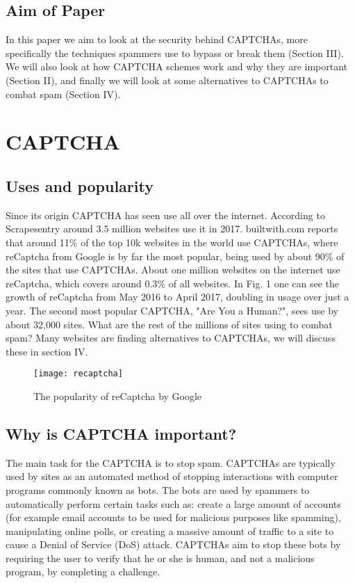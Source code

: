 \documentclass[a4paper]{IEEEtran}
\begin{document}
\subsection{Aim of Paper}
In this paper we aim to look at the security behind CAPTCHAs, more specifically the techniques spammers use to bypass or break them (Section III). We will also look at how CAPTCHA schemes work and why they are important (Section II), and finally we will look at some alternatives to CAPTCHAs to combat spam (Section IV). 

\section{CAPTCHA}

\subsection{Uses and popularity}
Since its origin CAPTCHA has seen use all over the internet. According to Scrapesentry around 3.5 million websites use it in 2017\cite{scrapesentry}. builtwith.com reports that around 11\% of the top 10k websites in the world use CAPTCHAs, where reCaptcha from Google is by far the most popular, being used by about 90\% of the sites that use CAPTCHAs\cite{stats}. About one million websites on the internet use reCaptcha, which covers around 0.3\% of all websites. In Fig. 1 one can see the growth of reCaptcha from May 2016 to April 2017, doubling in usage over just a year. The second most popular CAPTCHA, "Are You a Human?", sees use by about 32,000 sites. What are the rest of the millions of sites using to combat spam? Many websites are finding alternatives to CAPTCHAs, we will discuss these in section IV.

\begin{figure}
\centering
\texttt{[image: recaptcha]}
\caption[The popularity of reCaptcha]{The popularity of reCaptcha by Google\cite{recaptchastats}}
\label{Popularity of reCaptcha}
\end{figure} 

\subsection{Why is CAPTCHA important?}
The main task for the CAPTCHA is to stop spam. CAPTCHAs are typically used by sites as an automated method of stopping interactions with computer programs commonly known as bots. The bots are used by spammers to automatically perform certain tasks such as: create a large amount of accounts (for example email accounts to be used for malicious purposes like spamming), manipulating online polls, or creating a massive amount of traffic to a site to cause a Denial of Service (DoS) attack. CAPTCHAs aim to stop these bots by requiring the user to verify that he or she is human, and not a malicious program, by completing a challenge.
\end{document}
